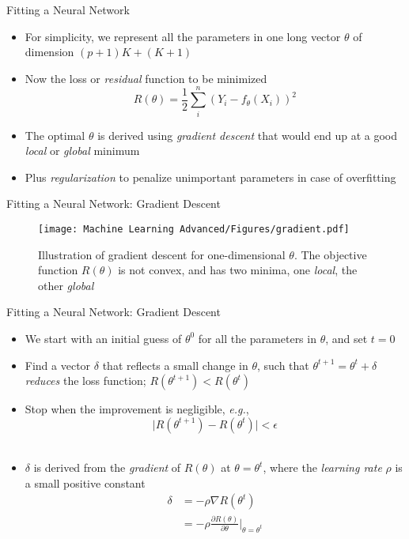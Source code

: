 \documentclass[aspectratio=1610,12pt,xcolor=dvipsnames]{beamer}
\begin{document}
\begin{frame}{Fitting a Neural Network}

\begin{itemize}
    \item For simplicity, we represent all the parameters in one long vector $\theta$ of dimension $(p+1)K+(K+1)$
    \item Now the loss or \textit{residual} function to be minimized
    \[
    R(\theta) = \frac{1}{2} \sum_i^n \left( Y_i - f_{\theta}(X_i)\right)^2
    \]
    \item The optimal $\theta$ is derived using \textit{gradient descent} that would end up at a good \textit{local} or \textit{global} minimum
    \item Plus \textit{regularization} to penalize unimportant parameters in case of overfitting
\end{itemize}
\end{frame}

\begin{frame}{Fitting a Neural Network: Gradient Descent}

\begin{figure}
    \centering
    \texttt{[image: Machine Learning Advanced/Figures/gradient.pdf]}
    \captionsetup{width=0.9\linewidth}
    \caption{Illustration of gradient descent for one-dimensional $\theta$. The objective function $R(\theta)$ is not convex, and has two minima, one \textit{local}, the other \textit{global}}
\end{figure}
\end{frame}

\begin{frame}{Fitting a Neural Network: Gradient Descent}

\begin{itemize}
    \item We start with an initial guess of $\theta^0$ for all the parameters in $\theta$, and set $t=0$
    \item Find a vector $\delta$ that reflects a small change in $\theta$, such that $\theta^{t+1} = \theta^t + \delta$ \textit{reduces} the loss function; $R(\theta^{t+1}) < R(\theta^{t})$
    \item Stop when the improvement is negligible, \textit{e.g.},
        \[\big|R(\theta^{t+1}) - R(\theta^{t})\big| < \epsilon\] \\[-15pt] \pause
    \item $\delta$ is derived from the \textit {gradient} of $R(\theta)$ at $\theta = \theta^{t}$, where the \textit{learning rate} $\rho$ is a small positive constant
    \begin{align*}
        \delta &= -\rho \nabla R(\theta^t) \\
        &= -\rho \frac{\partial R(\theta)}{\partial \theta} \bigg|_{\theta=\theta^t}
    \end{align*}
\end{itemize}
\end{frame}
\end{document}
